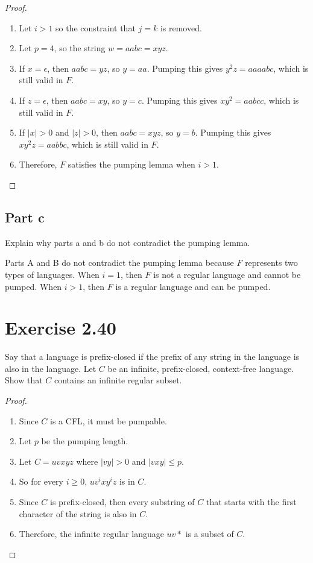 \documentclass{article}
\begin{document}
\begin{proof}
	\mbox{}
	\begin{enumerate}
	  \item Let $i > 1$ so the constraint that $j = k$ is removed.
	  \item Let $p = 4$, so the string $w = aabc = xyz$.
	  \item If $x = \epsilon$, then $aabc = yz$, so $y = aa$. Pumping this gives
	  $y^2z = aaaabc$, which is still valid in $F$.
	  \item If $z = \epsilon$, then $aabc = xy$, so $y = c$. Pumping this gives
	  $xy^2 = aabcc$, which is still valid in $F$.
	  \item If $|x| > 0$ and $|z| > 0$, then $aabc = xyz$, so $y = b$. Pumping this
	  gives $xy^2z = aabbc$, which is still valid in $F$.
	  \item Therefore, $F$ satisfies the pumping lemma when $i > 1$. \qedhere
	\end{enumerate}
\end{proof}

\subsection{Part c}

Explain why parts a and b do not contradict the pumping lemma.

Parts A and B do not contradict the pumping lemma because $F$ represents two
types of languages. When $i = 1$, then $F$ is not a regular language and cannot
be pumped. When $i > 1$, then $F$ is a regular language and can be pumped. 

\section{Exercise 2.40}

Say that a language is prefix-closed if the prefix of any string in the language
is also in the language. Let $C$ be an infinite, prefix-closed, context-free
language. Show that $C$ contains an infinite regular subset.

\begin{proof}
	\mbox{}
	\begin{enumerate}
	  \item Since $C$ is a CFL, it must be pumpable.
	  \item Let $p$ be the pumping length. 
	  \item Let $C = uvxyz$ where $|vy| > 0$ and $|vxy| \leq p$.
	  \item So for every $i \geq 0$, $uv^ixy^iz$ is in $C$.
	  \item Since $C$ is prefix-closed, then every substring of $C$ that starts
	  with the first character of the string is also in $C$.
	  \item Therefore, the infinite regular language $uv*$ is a subset of $C$. 
	\end{enumerate}
\end{proof} 
\end{document}
